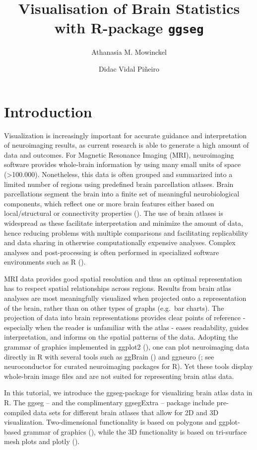 \documentclass[fleqn,10pt]{wlpeerj} %
\title{Visualisation of Brain Statistics with R-package \texttt{ggseg}}
\author[1]{Athanasia M. Mowinckel}
\author[1]{Didac Vidal Piñeiro}
\affil[1]{Center for Lifespan Changes in Brain and Cognition, Univeristy of Oslo, PO. box 1094 Blindern, 0317 Oslo, Norway}
\begin{document}
\flushbottom
\maketitle
\thispagestyle{empty}

\hypertarget{introduction}{%
\section{Introduction}\label{introduction}}

Visualization is increasingly important for accurate guidance and interpretation of neuroimaging results, as current research is able to generate a high amount of data and outcomes.
For Magnetic Resonance Imaging (MRI), neuroimaging software provides whole-brain information by using many small units of space (\textgreater{}100.000).
Nonetheless, this data is often grouped and summarized into a limited number of regions using predefined brain parcellation atlases.
Brain parcellations segment the brain into a finite set of meaningful neurobiological components, which reflect one or more brain features either based on local/structural or connectivity properties (\citet{eickhoff_2018}).
The use of brain atlases is widespread as these facilitate interpretation and minimize the amount of data, hence reducing problems with multiple comparisons and facilitating replicability and data sharing in otherwise computationally expensive analyses.
Complex analyses and post-processing is often performed in specialized software environments such as R (\citet{R}).

MRI data provides good spatial resolution and thus an optimal representation has to respect spatial relationships across regions.
Results from brain atlas analyses are most meaningfully visualized when projected onto a representation of the brain, rather than on other types of graphs (e.g.~bar charts).
The projection of data into brain representations provides clear points of reference - especially when the reader is unfamiliar with the atlas - eases readability, guides interpretation, and informs on the spatial patterns of the data.
Adopting the grammar of graphics implemented in ggplot2 (\citet{ggplot}), one can plot neuroimaging data directly in R with several tools such as ggBrain (\citet{ggBrain}) and ggneuro (\citet{ggneuro}; see neuroconductor \citeyearpar{neuroconductor} for curated neuroimaging packages for R).
Yet these tools display whole-brain image files and are not suited for representing brain atlas data.

In this tutorial, we introduce the ggseg-package for visualizing brain atlas data in R.
The ggseg -- and the complimentary ggsegExtra -- package include pre-compiled data sets for different brain atlases that allow for 2D and 3D visualization.
Two-dimensional functionality is based on polygons and ggplot-based grammar of graphics (\citet{ggplot}), while the 3D functionality is based on tri-surface mesh plots and plotly (\citet{plotly}).
\end{document}

